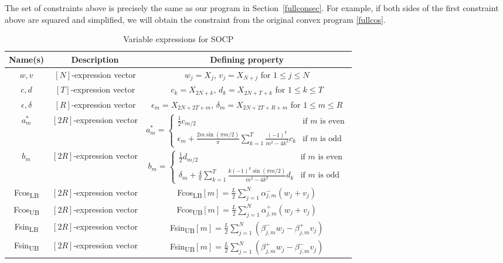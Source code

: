 \documentclass[12pt]{article}
\numberwithin{equation}{section}
\begin{document}
The set of constraints above is precisely the same as our program in Section~\ref{fullconsec}. For example, if both sides of the first constraint above are squared and simplified, we will obtain the constraint from the original convex program \eqref{fullcos}.







\renewcommand{\arraystretch}{1.5}

\begin{table}[!h] \centering
 \begin{tabular}{| c |c |c|} 
 \hline
          Name(s) & Description & Defining property \\ 
 \hline
 \hline


    $w,v$ &  $[N]$-expression vector  & $w_j = X_j$, $ v_j=X_{N+j} $ for $1 \leq j \leq N$ \\ 
   \hline
    $c,d$ &  $[T]$-expression vector  & $c_k = X_{2N+k}$, $ d_k=X_{2N+T+k} $ for $1 \leq k \leq T$ \\ 
   \hline
    $\epsilon,\delta$ &  $[R]$-expression vector& $\epsilon_m = X_{2N+2T+m}$, $ \delta_m=X_{2N+2T+R+m} $ for $1 \leq m \leq R$ \\ 
   \hline
 
  $a_m^*$ & $[2R]$-expression vector& $a_m^*=\begin{cases} \frac{1}{2}c_{m/2} & \text{if }m \text{ is even} \\ 
\epsilon_m+\frac{2m\sin(\pi m/2)}{\pi}  \sum_{k=1}^T \frac{(-1)^k }{m^2-4k^2} c_k & \text{if }m \text{ is odd} \end{cases} $ \\ 
    \hline
      $b_m$ &$[2R]$-expression vector & $ b_m=\begin{cases} \frac{1}{2}d_{m/2} & \text{if }m \text{ is even} \\ 
\delta_m+ \frac{4}{\pi} \sum_{k=1}^T \frac{k(-1)^k \sin(\pi m/2)}{m^2-4k^2} d_k & \text{if }m \text{ is odd} \end{cases} $ \\ 
    \hline
  Fcos\textsubscript{LB} & $[2R]$-expression vector &Fcos\textsubscript{LB}$[m]= \frac{L}{2}\sum_{j=1}^{N} \alpha_{j,m}^-(w_j+v_j)$ \\ 
 \hline
   Fcos\textsubscript{UB} & $[2R]$-expression vector & Fcos\textsubscript{UB}$[m]= \frac{L}{2}\sum_{j=1}^{N} \alpha_{j,m}^+(w_j+v_j)$ \\ 
 \hline
   Fsin\textsubscript{LB} & $[2R]$-expression vector &Fsin\textsubscript{UB}$[m]= \frac{L}{2}\sum_{j=1}^N (\beta_{j,m}^-w_j-\beta_{j,m}^+v_j)$ \\ 
 \hline
   Fsin\textsubscript{UB} & $[2R]$-expression vector &Fsin\textsubscript{UB}$[m]=  \frac{L}{2}\sum_{j=1}^N (\beta_{j,m}^+w_j-\beta_{j,m}^-v_j)$ \\ 
 \hline

\end{tabular}
\caption{Variable expressions for SOCP}
\label{socpex}
\end{table}
\end{document}
